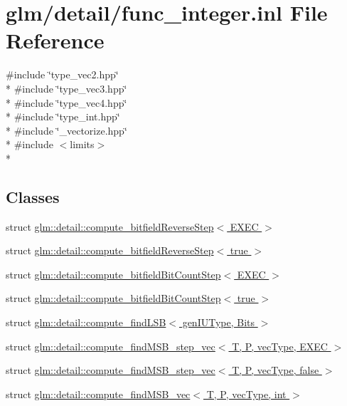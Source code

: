 \hypertarget{func__integer_8inl}{\section{glm/detail/func\-\_\-integer.inl File Reference}
\label{func__integer_8inl}
}
{\ttfamily \#include \char`\"{}type\-\_\-vec2.\-hpp\char`\"{}}\\*
{\ttfamily \#include \char`\"{}type\-\_\-vec3.\-hpp\char`\"{}}\\*
{\ttfamily \#include \char`\"{}type\-\_\-vec4.\-hpp\char`\"{}}\\*
{\ttfamily \#include \char`\"{}type\-\_\-int.\-hpp\char`\"{}}\\*
{\ttfamily \#include \char`\"{}\-\_\-vectorize.\-hpp\char`\"{}}\\*
{\ttfamily \#include $<$limits$>$}\\*
\subsection*{Classes}
\begin{DoxyCompactItemize}
\item 
struct \hyperlink{structglm_1_1detail_1_1compute__bitfieldReverseStep}{glm\-::detail\-::compute\-\_\-bitfield\-Reverse\-Step$<$ E\-X\-E\-C $>$}
\item 
struct \hyperlink{structglm_1_1detail_1_1compute__bitfieldReverseStep_3_01true_01_4}{glm\-::detail\-::compute\-\_\-bitfield\-Reverse\-Step$<$ true $>$}
\item 
struct \hyperlink{structglm_1_1detail_1_1compute__bitfieldBitCountStep}{glm\-::detail\-::compute\-\_\-bitfield\-Bit\-Count\-Step$<$ E\-X\-E\-C $>$}
\item 
struct \hyperlink{structglm_1_1detail_1_1compute__bitfieldBitCountStep_3_01true_01_4}{glm\-::detail\-::compute\-\_\-bitfield\-Bit\-Count\-Step$<$ true $>$}
\item 
struct \hyperlink{structglm_1_1detail_1_1compute__findLSB}{glm\-::detail\-::compute\-\_\-find\-L\-S\-B$<$ gen\-I\-U\-Type, Bits $>$}
\item 
struct \hyperlink{structglm_1_1detail_1_1compute__findMSB__step__vec}{glm\-::detail\-::compute\-\_\-find\-M\-S\-B\-\_\-step\-\_\-vec$<$ T, P, vec\-Type, E\-X\-E\-C $>$}
\item 
struct \hyperlink{structglm_1_1detail_1_1compute__findMSB__step__vec_3_01T_00_01P_00_01vecType_00_01false_01_4}{glm\-::detail\-::compute\-\_\-find\-M\-S\-B\-\_\-step\-\_\-vec$<$ T, P, vec\-Type, false $>$}
\item 
struct \hyperlink{structglm_1_1detail_1_1compute__findMSB__vec}{glm\-::detail\-::compute\-\_\-find\-M\-S\-B\-\_\-vec$<$ T, P, vec\-Type, int $>$}
\end{DoxyCompactItemize}
